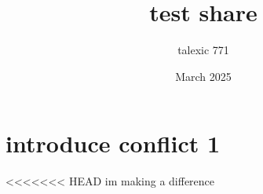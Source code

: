 \documentclass{article}
\title{test share}
\author{talexic 771 }
\date{March 2025}
\begin{document}
\maketitle

\section{introduce conflict 1}
<<<<<<< HEAD
im making a difference 
\end{document}
